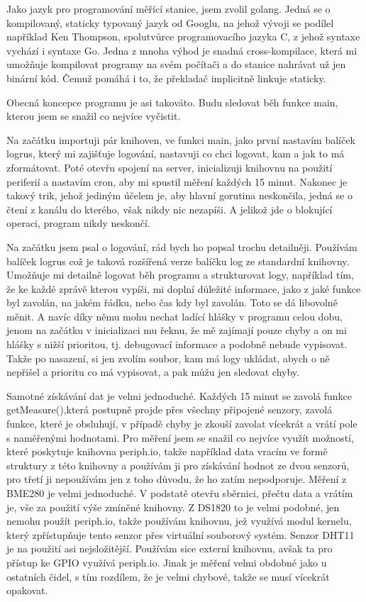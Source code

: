 Jako jazyk pro programování měřící stanice, jsem zvolil golang. Jedná se o kompilovaný, staticky typovaný jazyk od 
Googlu,  na jehož vývoji se podílel například Ken Thompson, spolutvůrce programovacího jazyka C, z jehož syntaxe vychází 
i syntaxe Go. Jedna z mnoha výhod je snadná cross-kompilace, která mi umožňuje kompilovat programy na svém počítači a do 
stanice nahrávat už jen binární kód. Čemuž pomáhá i to, že překladač implicitně linkuje staticky.

Obecná koncepce programu je asi takováto. Budu sledovat běh funkce main, kterou jsem se snažil co nejvíce vyčistit.

Na začátku importuji pár knihoven, ve funkci main, jako první nastavím balíček logrus, který mi zajišťuje logování, 
nastavuji co chci logovat, kam a jak to má zformátovat. Poté otevřu spojení na server, inicializuji knihovnu na použití 
periferií a nastavím cron, aby mi spustil měření každých 15 minut. Nakonec je takový trik, jehož jediným účelem je, aby 
hlavní gorutina neskončila, jedná se o čtení z kanálu do kterého, však nikdy nic nezapíši. A jelikož jde o blokující 
operaci, program nikdy neskončí.

Na začátku jsem psal o logování, rád bych ho popsal trochu detailněji. Používám balíček logrus což je taková rozšířená 
verze balíčku log ze standardní knihovny. Umožňuje mi detailně logovat běh programu a strukturovat logy, například tím, 
že ke každé zprávě kterou vypíši, mi doplní důležité informace, jako z jaké funkce byl zavolán, na jakém řádku, nebo čas 
kdy byl zavolán. Toto se dá libovolně měnit. A navíc díky němu mohu nechat ladící hlášky v programu celou dobu, jenom na 
začátku v inicializaci mu řeknu, že mě zajímají pouze chyby a on mi hlášky s nižší prioritou, tj. debugovací informace 
a podobně nebude vypisovat. Takže po nasazení, si jen zvolím soubor, kam má logy ukládat, abych o ně nepřišel a prioritu 
co má vypisovat, a pak můžu jen sledovat chyby.

Samotné získávání dat je velmi jednoduché. Každých 15 minut se zavolá funkce getMeasure(),která postupně projde přes 
všechny připojené senzory, zavolá funkce, které je obsluhují, v případě chyby je zkouší zavolat vícekrát a vrátí pole 
s naměřenými hodnotami. Pro měření jsem se snažil co nejvíce využít možností, které poskytuje knihovna periph.io, takže 
například data vracím ve formě struktury z této knihovny a používám ji pro získávání hodnot ze dvou senzorů, pro třetí 
ji nepoužívám jen z toho důvodu, že ho zatím nepodporuje. Měření z BME280 je velmi jednoduché. V podstatě otevřu 
sběrnici, přečtu data a vrátím je, vše za použití výše zmíněné knihovny. Z DS1820 to je velmi podobné, jen nemohu použít 
periph.io, takže používám knihovnu, jež využívá modul kernelu, který zpřístupňuje tento senzor přes virtuální souborový 
systém. Senzor DHT11 je na použití asi nejsložitější. Používám sice externí knihovnu, avšak ta pro přístup ke GPIO 
využívá periph.io. Jinak je měření velmi obdobné jako u ostatních čidel, s tím rozdílem, že je velmi chybové, takže se 
musí vícekrát opakovat.

